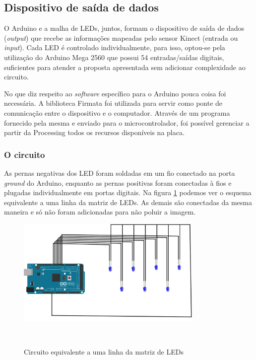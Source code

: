 \subsection{\textbf{Dispositivo de saída de dados}}

O Arduino e a malha de LEDs, juntos, formam o dispositivo de saída de dados (\textit{output}) que recebe as informações mapeadas pelo sensor Kinect (entrada ou \textit{input}). Cada LED é controlado individualmente, para isso, optou-se pela utilização do Arduino Mega 2560 que possui 54 entradas/saídas digitais, suficientes para atender a proposta apresentada sem adicionar complexidade ao circuito.


No que diz respeito ao \textit{software} específico para o Arduino pouca coisa foi necessária. A biblioteca Firmata foi utilizada para servir como ponte de comunicação entre o dispositivo e o computador. Através de um programa fornecido pela mesma e enviado para o microcontrolador, foi possível gerenciar a partir da Processing todos os recursos disponíveis na placa.

\subsubsection{O circuito}

As pernas negativas dos LED foram soldadas em um fio conectado na porta \textit{ground} do Arduino, enquanto as pernas positivas foram conectadas à fios e plugadas individualmente em portas digitais. Na figura \ref{fig:breadboard} podemos ver o esquema equivalente a uma linha da matriz de LEDs. As demais são conectadas da mesma maneira e só não foram adicionadas para não poluir a imagem.

\begin{figure}[H]
  \begin{center}
    \caption{Circuito equivalente a uma linha da matriz de LEDs}
    \vspace*{0,2cm}
    \includegraphics[width=0.8\textwidth]{./04-figuras/breadboard}
    \label{fig:breadboard}
  \end{center}
  \vspace*{-0,5cm}
  \\
\end{figure}

